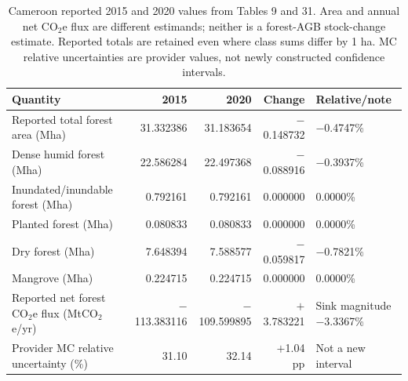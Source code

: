 \begin{table}[htbp]
\centering\small
\caption{Cameroon reported 2015 and 2020 values from Tables 9 and 31. Area and annual net CO$_2$e flux are different estimands; neither is a forest-AGB stock-change estimate. Reported totals are retained even where class sums differ by 1 ha. MC relative uncertainties are provider values, not newly constructed confidence intervals.}\label{tab:SI_Cameroon_reported}
\begin{tabularx}{\textwidth}{XrrrX}\toprule
Quantity & 2015 & 2020 & Change & Relative/note\\\midrule
Reported total forest area (Mha) & 31.332386 & 31.183654 & $-$0.148732 & $-$0.4747\%\\
Dense humid forest (Mha) & 22.586284 & 22.497368 & $-$0.088916 & $-$0.3937\%\\
Inundated/inundable forest (Mha) & 0.792161 & 0.792161 & 0.000000 & 0.0000\%\\
Planted forest (Mha) & 0.080833 & 0.080833 & 0.000000 & 0.0000\%\\
Dry forest (Mha) & 7.648394 & 7.588577 & $-$0.059817 & $-$0.7821\%\\
Mangrove (Mha) & 0.224715 & 0.224715 & 0.000000 & 0.0000\%\\
Reported net forest CO$_2$e flux (MtCO$_2$e/yr) & $-$113.383116 & $-$109.599895 & $+$3.783221 & Sink magnitude $-$3.3367\%\\
Provider MC relative uncertainty (\%) & 31.10 & 32.14 & $+$1.04 pp & Not a new interval\\
\bottomrule\end{tabularx}
\end{table}

